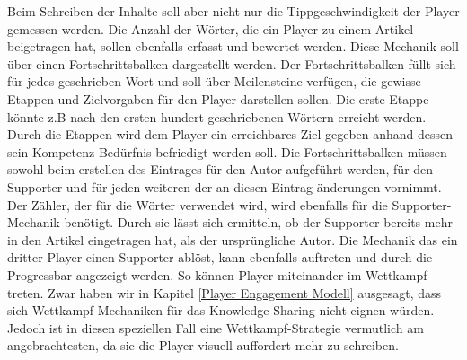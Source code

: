 \documentclass[a4paper,12pt,twoside]{scrartcl}
\begin{document}
Beim Schreiben der Inhalte soll aber nicht nur die Tippgeschwindigkeit der Player gemessen werden. Die Anzahl der Wörter, die ein Player zu einem Artikel beigetragen hat, sollen ebenfalls erfasst und bewertet werden. Diese Mechanik soll über einen Fortschrittsbalken dargestellt werden. Der Fortschrittsbalken füllt sich für jedes geschrieben Wort und soll über Meilensteine verfügen, die gewisse Etappen und Zielvorgaben für den Player darstellen sollen. Die erste Etappe könnte z.B nach den ersten hundert geschriebenen Wörtern erreicht werden. Durch die Etappen wird dem Player ein erreichbares Ziel gegeben anhand dessen sein Kompetenz-Bedürfnis befriedigt werden soll. Die Fortschrittsbalken müssen sowohl beim erstellen des Eintrages für den Autor aufgeführt werden, für den Supporter und für jeden weiteren der an diesen Eintrag änderungen vornimmt. Der Zähler, der für die Wörter verwendet wird, wird ebenfalls für die Supporter-Mechanik benötigt. Durch sie lässt sich ermitteln, ob der Supporter bereits mehr in den Artikel eingetragen hat, als der ursprüngliche Autor. Die Mechanik das ein dritter Player einen Supporter ablöst, kann ebenfalls auftreten und durch die Progressbar angezeigt werden. So können Player miteinander im Wettkampf treten. Zwar haben wir in Kapitel \ref{Player Engagement Modell} ausgesagt, dass sich Wettkampf Mechaniken für das Knowledge Sharing nicht eignen würden. Jedoch ist in diesen speziellen Fall eine Wettkampf-Strategie vermutlich am angebrachtesten, da sie die Player visuell auffordert mehr zu schreiben.
\end{document}
